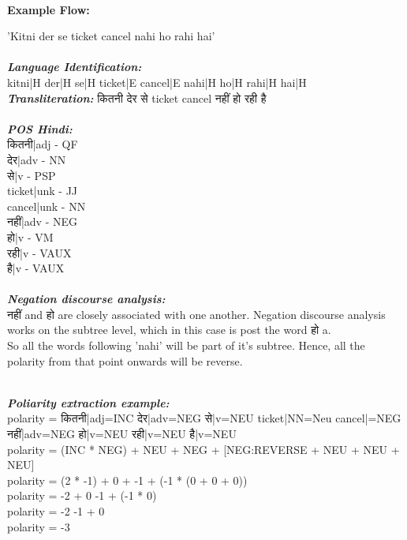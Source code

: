 \documentclass[conference]{IEEEtran}
\begin{document}
\\
\textbf{Example Flow: }
\hline
\begin{algorithmic}[1]
 \renewcommand{\algorithmicrequire}{\textbf{Input:}}
 \REQUIRE 'Kitni der se ticket cancel nahi ho rahi hai'\\
 \\ \textbf{\textit{Language Identification:} }
 \\ kitni|H der|H se|H ticket|E cancel|E nahi|H ho|H rahi|H hai|H
 \\ \textbf{\textit{Transliteration: }} 
   \foreignlanguage{sanskrit}{
कितनी देर से
}
ticket cancel
\foreignlanguage{sanskrit}{
नहीं हो रही है  
}\\
\\ \textbf{\textit{POS Hindi:}}\\
\foreignlanguage{sanskrit}{कितनी}|adj - QF\\
\foreignlanguage{sanskrit}{देर}|adv - NN\\
\foreignlanguage{sanskrit}{से}|v - PSP\\
ticket|unk - JJ\\
cancel|unk - NN\\
\foreignlanguage{sanskrit}{नहीं}|adv - NEG\\
\foreignlanguage{sanskrit}{हो}|v - VM\\
\foreignlanguage{sanskrit}{रही}|v - VAUX\\
\foreignlanguage{sanskrit}{है}|v - VAUX\\

\\ \textbf{\textit{Negation discourse analysis:}} \\
\foreignlanguage{sanskrit}{नहीं} and \foreignlanguage{sanskrit}{हो} are closely
associated with one another. Negation discourse analysis works on the subtree
level, which in this case is post the word \foreignlanguage{sanskrit}{हो} a. \\
So all the words following 'nahi' will be part of it's subtree. Hence, all the
polarity from that point onwards will be reverse.

\\\textbf{\textit{Poliarity extraction example:}} \\
polarity = \foreignlanguage{sanskrit}{कितनी}|adj=INC
\foreignlanguage{sanskrit}{देर}|adv=NEG \foreignlanguage{sanskrit}{से}|v=NEU
ticket|NN=Neu cancel|=NEG \foreignlanguage{sanskrit}{नहीं}|adv=NEG
\foreignlanguage{sanskrit}{हो}|v=NEU  \foreignlanguage{sanskrit}{रही}|v=NEU
\foreignlanguage{sanskrit}{है}|v=NEU\\ 
polarity = (INC * NEG) + NEU + NEG + [NEG:REVERSE + NEU + NEU + NEU]\\
polarity = (2 * -1) + 0 + -1 + (-1 * (0 + 0 + 0))\\
polarity = -2 + 0 -1 + (-1 * 0)\\
polarity = -2 -1 + 0\\
polarity = -3\\

\end{algorithmic} 
\end{document}

